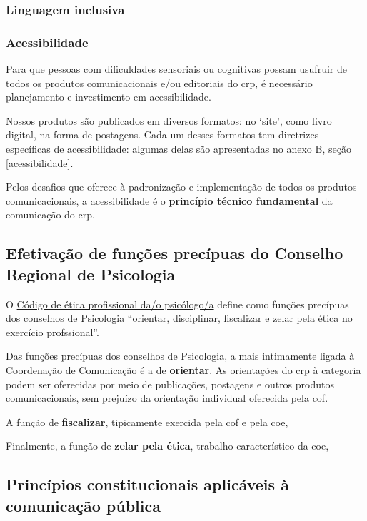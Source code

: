 \subsubsection{Linguagem inclusiva}

\subsubsection{Acessibilidade}

Para que pessoas com dificuldades sensoriais ou cognitivas possam usufruir de todos os produtos comunicacionais e/ou editoriais do \ac{crp}, é necessário planejamento e investimento em acessibilidade.

Nossos produtos são publicados em diversos formatos: no `site', como livro digital, na forma de postagens. Cada um desses formatos tem diretrizes específicas de acessibilidade: algumas delas são apresentadas no anexo B, seção  \ref{acessibilidade}.

Pelos desafios que oferece à padronização e implementação de todos os produtos comunicacionais, a acessibilidade é o \textbf{princípio técnico fundamental} da comunicação do \ac{crp}.

\subsection{Efetivação de funções precípuas do Conselho Regional de Psicologia}

O \href{http://bibliotecadigita1.hospedagemdesites.ws/wp-content/uploads/2022/08/Co%CC%81digo-de-e%CC%81tica-profissional-dao-psico%CC%81logo.pdf}{Código de ética profissional da/o psicólogo/a} define como funções precípuas dos conselhos de Psicologia ``orientar, disciplinar, fiscalizar e zelar pela ética no exercício profssional''.

Das funções precípuas dos conselhos de Psicologia, a mais intimamente ligada à Coordenação de Comunicação é a de \textbf{orientar}. As orientações do \ac{crp} à categoria podem ser oferecidas por meio de publicações, postagens e outros produtos comunicacionais, sem prejuízo da orientação individual oferecida pela \ac{cof}.

A função de \textbf{fiscalizar}, tipicamente exercida pela \ac{cof} e pela \ac{coe}, 

Finalmente, a função de \textbf{zelar pela ética}, trabalho característico da \ac{coe},

\subsection{Princípios constitucionais aplicáveis à comunicação pública}

